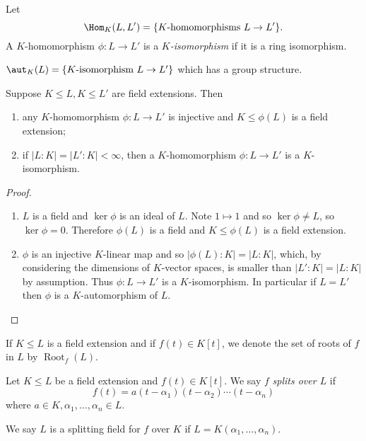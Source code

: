 \documentclass[a4paper]{article}
\DeclareMathOperator{\Root}{Root}
\begin{document}
\begin{notation}
  Let
  \[
    \Hom_K(L, L') = \{K\text{-homomorphisms } L \to L'\}.
  \]
  A \(K\)-homomorphism \(\phi: L \to L'\) is a \emph{\(K\)-isomorphism} if it is a ring isomorphism.
\end{notation}

\begin{notation}
  \(\aut_K(L) = \{K\text{-isomorphism } L \to L'\}\) which has a group structure.
\end{notation}

\begin{lemma}
  Suppose \(K \leq L, K \leq L'\) are field extensions. Then
  \begin{enumerate}
  \item any \(K\)-homomorphism \(\phi: L \to L'\) is injective and \(K \leq \phi(L)\) is a field extension;
  \item if \(|L : K| = |L' : K| < \infty\), then a \(K\)-homomorphism \(\phi: L \to L'\) is a \(K\)-isomorphism.
  \end{enumerate}
\end{lemma}

\begin{proof}\leavevmode
  \begin{enumerate}
  \item \(L\) is a field and \(\ker \phi\) is an ideal of \(L\). Note \(1 \mapsto 1\) and so \(\ker \phi \neq L\), so \(\ker \phi = 0\). Therefore \(\phi(L)\) is a field and \(K \leq \phi(L)\) is a field extension.

  \item \(\phi\) is an injective \(K\)-linear map and so \(|\phi(L) : K| = |L : K|\), which, by considering the dimensions of \(K\)-vector spaces, is smaller than \(|L' : K| = |L : K|\) by assumption. Thus \(\phi: L \to L'\) is a \(K\)-isomorphism. In particular if \(L = L'\) then \(\phi\) is a \(K\)-automorphism of \(L\).
  \end{enumerate}
\end{proof}

\begin{notation}
  If \(K \leq L\) is a field extension and if \(f(t) \in K[t]\), we denote the set of roots of \(f\) in \(L \) by \(\Root_f(L)\).
\end{notation}

\begin{definition}
  Let \(K \leq L\) be a field extension and \(f(t) \in K[t]\). We say \(f\) \emph{splits over \(L\)} if
  \[
    f(t) = a(t - \alpha_1) (t - \alpha_2) \cdots (t - \alpha_n)
  \]
  where \(a \in K, \alpha_1, \dots, \alpha_n \in L\).

  We say \(L\) is a splitting field for \(f\) over \(K\) if \(L = K(\alpha_1, \dots, \alpha_n)\).
\end{definition}
\end{document}
